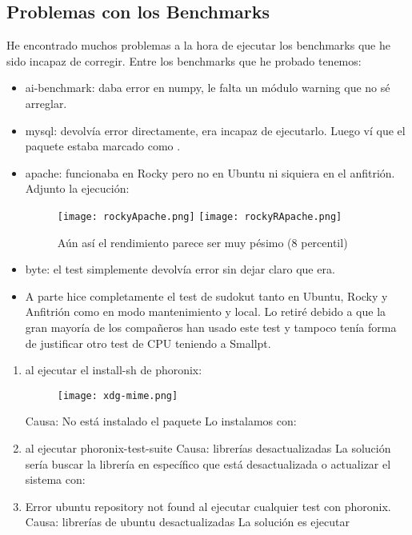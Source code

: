 \subsection{Problemas con los Benchmarks}
He encontrado muchos problemas a la hora de ejecutar los benchmarks que he sido incapaz de corregir. Entre los benchmarks que he probado tenemos:
\begin{itemize}
	\item ai-benchmark: daba error en numpy, le falta un módulo warning que no sé arreglar.
	
	\item mysql: devolvía error directamente, era incapaz de ejecutarlo. Luego ví que el paquete estaba marcado como .
	
	\item apache: funcionaba en Rocky pero no en Ubuntu ni siquiera en el anfitrión. Adjunto la ejecución: 
	\begin{figure}[H]
		\centering
		\texttt{[image: rockyApache.png]}
		\texttt{[image: rockyRApache.png]}
		\caption{Aún así el rendimiento parece ser muy pésimo (8 percentil)}
	\end{figure}

	\item byte: el test simplemente devolvía error sin dejar claro que era. 
	
	\item A parte hice completamente el test de sudokut tanto en Ubuntu, Rocky y Anfitrión como en modo mantenimiento y local. Lo retiré debido a que la gran mayoría de los compañeros han usado este test y tampoco tenía forma de justificar otro test de CPU teniendo a Smallpt. 
\end{itemize}
\begin{enumerate}
	\item {} al ejecutar el install-sh de phoronix:
	\begin{figure}[H]
		\centering
		\texttt{[image: xdg-mime.png]}
	\end{figure}
	Causa: No está instalado el paquete 
	Lo instalamos con: 
	\item {} al ejecutar phoronix-test-suite
	Causa: librerías desactualizadas
	La solución sería buscar la librería en específico que está desactualizada o actualizar el sistema con: 
	\item Error  ubuntu repository not found al ejecutar cualquier test con phoronix.
	Causa: librerías de ubuntu desactualizadas
	La solución es ejecutar 
\end{enumerate}

